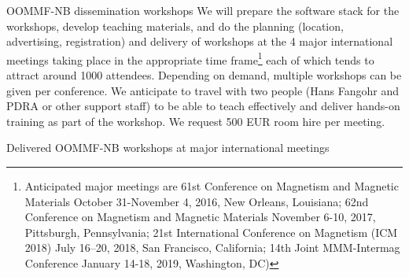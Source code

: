 \begin{workpackage}[id=dissem,wphases=18-48!.5,
  title=Dissemination,
  SARM=1,
  USORM=7]
\begin{tasklist}
\begin{task}{OOMMF-NB dissemination workshops}
  We will prepare the software stack for the workshops, develop teaching
  materials, and do the planning (location, advertising, registration)
  and delivery of workshops at the 4 major international meetings
  taking place in the appropriate time frame\footnote{Anticipated
    major meetings are 61st Conference
    on Magnetism and Magnetic Materials October 31-November 4, 2016,
    New Orleans, Louisiana; 62nd Conference on Magnetism and Magnetic
    Materials November 6-10, 2017, Pittsburgh, Pennsylvania; 21st
    International Conference on Magnetism (ICM 2018) July 16–20, 2018,
    San Francisco, California; 14th Joint MMM-Intermag Conference
    January 14-18, 2019, Washington, DC)} each of which tends to
  attract around 1000 attendees. Depending on demand, multiple
  workshops can be given per conference. We anticipate to travel with two
  people (Hans Fangohr and PDRA or other support staff) to be able to teach
  effectively and deliver hands-on training as part of the
  workshop. We request 500 EUR room hire per meeting.
\end{task}
\end{tasklist}

\begin{wpdelivs}
  \begin{wpdeliv}[due=48,id=del:OOMMF-NB-workshops,dissem=??,nature=??]
      {Delivered OOMMF-NB workshops at major international meetings}
\end{wpdeliv}
\end{wpdelivs}


\end{workpackage}
